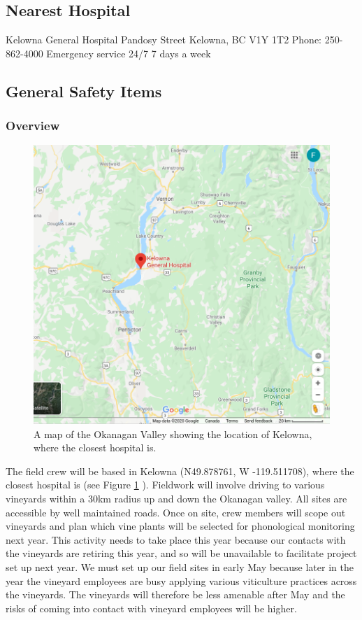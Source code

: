 \documentclass[11pt,letter]{article}
\begin{document}
\subsection {Nearest Hospital}
Kelowna General Hospital  Pandosy Street\newline
Kelowna, BC V1Y 1T2\newline
Phone: 250-862-4000\newline
Emergency service 24/7 7 days a week


\subsection {General Safety Items}

\subsubsection{Overview}
\begin{figure}
  \includegraphics[width=\linewidth]{OkanaganMap.png}
  \caption{A map of the Okanagan Valley showing the location of Kelowna, where the closest hospital is.}
  \label{fig:OkanMap}
\end{figure}
The field crew will be based in Kelowna (N49.878761, W -119.511708), where the closest hospital is (see Figure \ref{fig:OkanMap} ). Fieldwork will involve driving to various vineyards within a 30km radius up and down the Okanagan valley. All sites are accessible by well maintained roads. Once on site, crew members will scope out vineyards and plan which vine plants will be selected for phonological monitoring next year. This activity needs to take place this year because our contacts with the vineyards are retiring this year, and so will be unavailable to facilitate project set up next year. We must set up our field sites in early May because later in the year the vineyard employees are busy applying various viticulture practices across the vineyards. The vineyards will therefore be less amenable after May and the risks of coming into contact with vineyard employees will be higher.   
\end{document}
